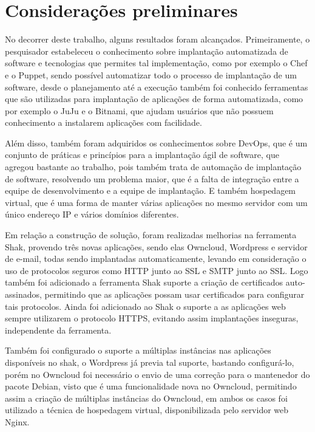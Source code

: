 \chapter{Considerações preliminares}
\label{cap-conclusoes}

No decorrer deste trabalho, alguns resultados foram alcançados. Primeiramente, o
pesquisador estabeleceu o conhecimento sobre implantação automatizada
de software e tecnologias que permites tal implementação, como por exemplo o Chef
e o Puppet, sendo possível automatizar todo o processo de implantação de um software,
desde o planejamento até a execução também foi conhecido ferramentas que são
utilizadas para implantação de aplicações de forma automatizada, como por exemplo
o JuJu e o Bitnami, que ajudam usuários que não possuem conhecimento a
instalarem aplicações com facilidade.

Além disso, também foram adquiridos os conhecimentos sobre DevOps, que é um conjunto
de práticas e princípios para a implantação ágil de software, que agregou bastante
ao trabalho, pois também trata de automação de implantação de software, resolvendo
um problema maior, que é a falta de integração entre a equipe de desenvolvimento
e a equipe de implantação. E também hospedagem virtual, que é uma forma de manter
várias aplicações no mesmo servidor com um único endereço IP e vários domínios diferentes.

Em relação a construção de solução, foram realizadas melhorias na ferramenta Shak,
provendo três novas aplicações, sendo elas Owncloud, Wordpress e servidor de e-mail,
todas sendo implantadas automaticamente, levando em consideração o uso de protocolos
seguros como HTTP junto ao SSL e SMTP junto ao SSL. Logo também foi adicionado a
ferramenta Shak suporte a criação de certificados auto-assinados, permitindo que
as aplicações possam usar certificados para configurar tais protocolos. Ainda foi
adicionado ao Shak o suporte a as aplicações web sempre utilizarem
o protocolo HTTPS, evitando assim implantações inseguras, independente da ferramenta.

Também foi configurado o suporte a múltiplas instâncias nas aplicações disponíveis
no shak, o Wordpress já previa tal suporte, bastando configurá-lo, porém no Owncloud
foi necessário o envio de uma correção para o mantenedor do pacote Debian, visto que
é uma funcionalidade nova no Owncloud, permitindo assim a criação de múltiplas
instâncias do Owncloud, em ambos os casos foi utilizado a técnica de hospedagem
virtual, disponibilizada pelo servidor web Nginx.

